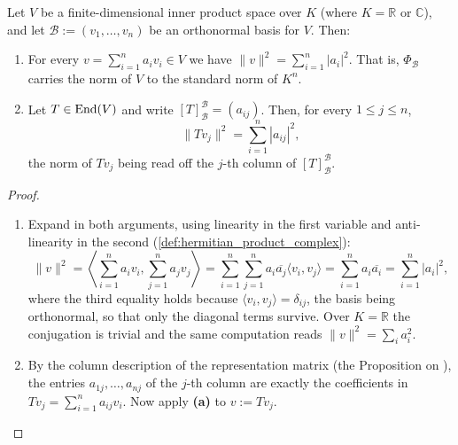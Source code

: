 \begin{ailemma}
\label{ailem:norm_in_orthonormal_basis}
Let $V$ be a finite-di\-men\-sional inner product space over $K$ (where $K = \mathbb{R}$ or $\mathbb{C}$), and let $\mathcal{B} := (v_1, \dots, v_n)$ be an orthonormal basis for $V$. Then:
\begin{enumerate}[label=\textbf{(\alph*)}]
    \item For every $v = \sum_{i=1}^n a_i v_i \in V$ we have $\|v\|^2 = \sum_{i=1}^n |a_i|^2$. That is, $\Phi_{\mathcal{B}}$ carries the norm of $V$ to the standard norm of $K^n$.
    \item Let $T \in \operatorname{End}(V)$ and write $[T]_{\mathcal{B}}^{\mathcal{B}} = (a_{ij})$. Then, for every $1 \leq j \leq n$,
    \[
        \|T v_j\|^2 = \sum_{i=1}^n |a_{ij}|^2,
    \]
    the norm of $T v_j$ being read off the $j$-th column of $[T]_{\mathcal{B}}^{\mathcal{B}}$.
\end{enumerate}
\end{ailemma}

\begin{proof}
\begin{enumerate}[label=\textbf{(\alph*)}]
    \item Expand in both arguments, using linearity in the first variable and anti-linearity in the second (\cref{def:hermitian_product_complex}):
    \[
        \|v\|^2 = \left\langle \sum_{i=1}^n a_i v_i, \sum_{j=1}^n a_j v_j \right\rangle = \sum_{i=1}^n \sum_{j=1}^n a_i \overline{a_j} \langle v_i, v_j \rangle = \sum_{i=1}^n a_i \overline{a_i} = \sum_{i=1}^n |a_i|^2,
    \]
    where the third equality holds because $\langle v_i, v_j \rangle = \delta_{ij}$, the basis being orthonormal, so that only the diagonal terms survive. Over $K = \mathbb{R}$ the conjugation is trivial and the same computation reads $\|v\|^2 = \sum_i a_i^2$.

    \item By the column description of the representation matrix (the Proposition on ), the entries $a_{1j}, \dots, a_{nj}$ of the $j$-th column are exactly the coefficients in $T v_j = \sum_{i=1}^n a_{ij} v_i$. Now apply \textbf{(a)} to $v := T v_j$.
\end{enumerate}
\end{proof}


